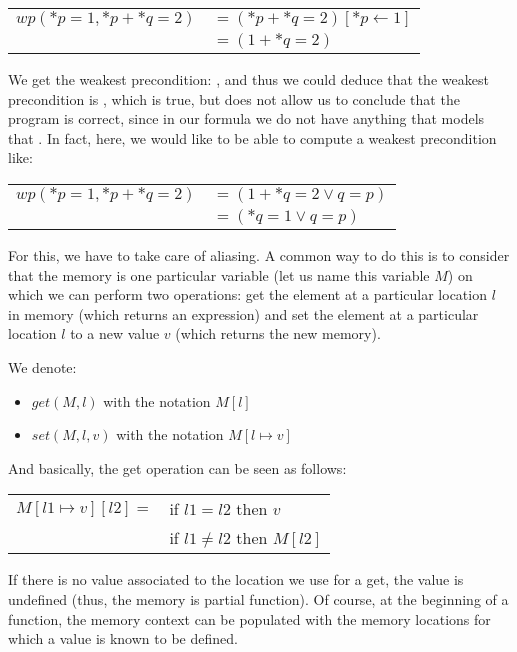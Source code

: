 \begin{tabular}{ll}
$wp(*p = 1, *p + *q = 2)$ & $= (*p + *q = 2)[*p \leftarrow 1]$\\
                          & $= (1 + *q = 2)$
\end{tabular}



We get the weakest precondition: , and thus we could
deduce that the weakest precondition is , which is true, but
does not allow us to conclude that the program is correct, since in our formula
we do not have anything that models that . In
fact, here, we would like to be able to compute a weakest precondition like:



\begin{tabular}{ll}
$wp(*p = 1, *p + *q = 2)$ & $= (1 + *q = 2 \vee q = p)$\\
                          & $= (*q = 1 \vee q = p)$
\end{tabular}



For this, we have to take care of aliasing. A common way to do this is to
consider that the memory is one particular variable (let us name this variable
$M$) on which we can perform two operations: get the element at a particular
location $l$ in memory (which returns an expression) and set the element at a
particular location $l$ to a new value $v$ (which returns the new memory).


We denote:


\begin{itemize}
\item $get(M,l)$ with the notation $M[l]$
\item $set(M,l,v)$ with the notation $M[l \mapsto v]$
\end{itemize}


And basically, the get operation can be seen as follows:


\begin{tabular}{ll}
  $M[l1 \mapsto v][l2] =$ & if $l1   =  l2$ then $v$ \\
                          & if $l1 \neq l2$ then $M[l2]$
\end{tabular}


If there is no value associated to the location we use for a get, the value is
undefined (thus, the memory is partial function). Of course, at the beginning of
a function, the memory context can be populated with the memory locations for
which a value is known to be defined.


